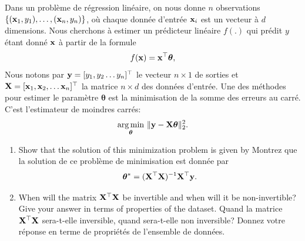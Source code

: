 \documentclass[11pt,french,english]{article}
\newcommand{\french}[1]{ {\color{blue} #1} }
\renewcommand{\vec}[1]{{\bf #1}}
\newcommand{\mat}[1]{{\bf #1}}
\newcommand{\x}{\vec{x}}
\newcommand{\y}{\vec{y}}
\newcommand{\X}{\mat{X}}
\DeclareMathOperator*{\argmin}{arg\,min}
\begin{document}
\begin{enumerate}
\begin{enumerate}
    \french{Dans un problème de régression linéaire, on nous donne $n$ observations $\{ (\x_1, y_1),\dots,(\x_n, y_n)\}$, où chaque donnée d'entrée $\x_i$ est un vecteur à $d$ dimensions. Nous cherchons à estimer un prédicteur linéaire $f(.)$ qui prédit $y$ étant donné $\x$ à partir de la formule
    \begin{equation}
        f(\x) = \x^\top\boldsymbol{\theta},
    \end{equation}
    Nous notons par ${\bf y} = [y_1, y_2 \dots y_n]^\top$ le vecteur $n \times 1$ de sorties et ${\bf X} = [\x_1, \x_2, \dots \x_n]^\top$ la matrice $n \times d$ des données d'entrée. Une des méthodes pour estimer le paramètre $\boldsymbol{\theta}$ est la minimisation de la somme des erreurs au carré. C'est l'estimateur de moindres carrés:
    \begin{equation}
    \argmin_{\boldsymbol{\theta}} \ \lVert {\bf y} - {\bf X}\boldsymbol{\theta} \rVert_2^2.
    \label{eq:LS_q3}        
    \end{equation}}
    \begin{enumerate}
        \item  Show that the solution of this minimization problem is given by \french{Montrez que la solution de ce problème de minimisation est donnée par}
    $$ {\boldsymbol \theta}^* = (\X^\top\X)^{-1}\X^\top \y .$$
    \item When will the matrix $\X^\top \X$ be invertible and when will it be non-invertible? Give your answer in terms of properties of the dataset.\french{Quand la matrice $\X^\top \X$ sera-t-elle inversible, quand sera-t-elle non inversible? Donnez votre réponse en terme de propriétés de l'ensemble de données.}
    \end{enumerate}
     
    
    
    

\end{enumerate}
\end{enumerate}
\end{document}
